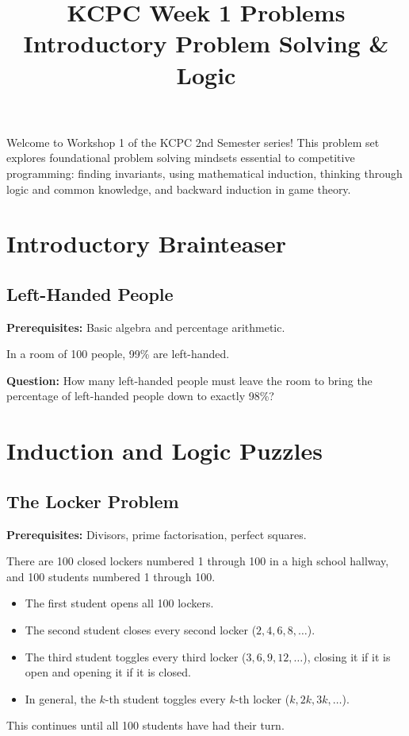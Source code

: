 \documentclass[12pt]{article}
\title{KCPC Week 1 Problems\\Introductory Problem Solving \& Logic}
\author{}
\date{}
\begin{document}
\maketitle
\thispagestyle{fancy}

\noindent
Welcome to Workshop 1 of the KCPC 2nd Semester series! This problem set explores foundational problem solving mindsets essential to competitive programming: finding invariants, using mathematical induction, thinking through logic and common knowledge, and backward induction in game theory.

\section{Introductory Brainteaser}

\subsection{Left-Handed People}
\textbf{Prerequisites:} Basic algebra and percentage arithmetic.

In a room of 100 people, 99\% are left-handed.

\textbf{Question:} How many left-handed people must leave the room to bring the percentage of left-handed people down to exactly 98\%?

\section{Induction and Logic Puzzles}

\subsection{The Locker Problem}
\textbf{Prerequisites:} Divisors, prime factorisation, perfect squares.

There are 100 closed lockers numbered 1 through 100 in a high school hallway, and 100 students numbered 1 through 100.
\begin{itemize}
    \item The first student opens all 100 lockers.
    \item The second student closes every second locker ($2, 4, 6, 8, \dots$).
    \item The third student toggles every third locker ($3, 6, 9, 12, \dots$), closing it if it is open and opening it if it is closed.
    \item In general, the $k$-th student toggles every $k$-th locker ($k, 2k, 3k, \dots$).
\end{itemize}
This continues until all 100 students have had their turn.
\end{document}

